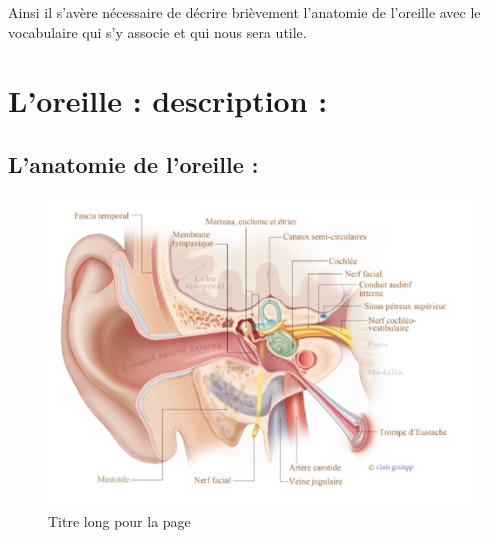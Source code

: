 Ainsi il s'avère nécessaire de décrire brièvement l'anatomie de l'oreille
avec le vocabulaire qui s'y associe et qui nous sera utile.

\section{L'oreille : description : }

\subsection{L'anatomie de l'oreille :}
\begin{figure}
	\centering
	\includegraphics[width=0.7\linewidth]{"images/20160624Berufsfeldgruppen"}
	\caption[Titre pour toc]{Titre long pour la page}
	\label{fig:-20160624berufsfeldgruppen}
\end{figure}


%

